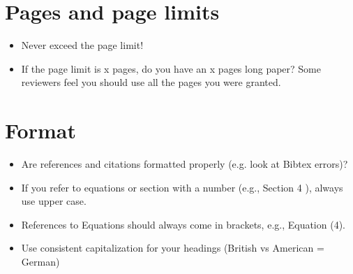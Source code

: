 \section{Pages and page limits}
\begin{itemize}

\item Never exceed the page limit!
\item If the page limit is x pages, do you have an x pages long paper? Some reviewers feel you should use all the pages you
were granted.

\end{itemize}

\section{Format}
\begin{itemize}

\item Are references and citations formatted properly (e.g. look at Bibtex errors)?
\item If you refer to equations or section with a number (e.g., Section 4 ), always use upper case.
\item References to Equations should always come in brackets, e.g., Equation (4).
\item Use consistent capitalization for your headings (British vs American = German)

\end{itemize}
